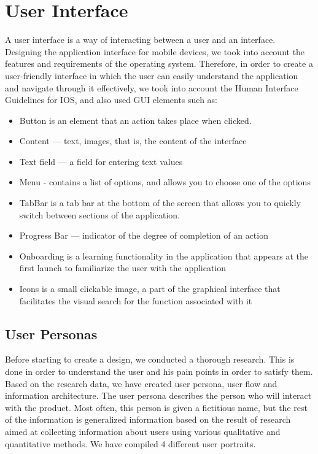 \section{User Interface}

A user interface is a way of interacting between a user and an interface. Designing the
application interface for mobile devices, we took into account the features and requirements of the operating system. Therefore, in order to create a user-friendly interface in which the user can easily understand the application and navigate through it effectively, we took into account the Human Interface Guidelines for IOS, and also used GUI elements such as: \cite{design}

\begin{itemize}
    \item Button is an element that an action takes place when clicked.
    \item Content — text, images, that is, the content of the interface
    \item Text field — a field for entering text values
    \item Menu - contains a list of options, and allows you to choose one of the options
    \item TabBar is a tab bar at the bottom of the screen that allows you to quickly switch between sections of the application.
    \item Progress Bar — indicator of the degree of completion of an action
    \item Onboarding is a learning functionality in the application that appears at the first launch to familiarize the user with the application
    \item Icons is a small clickable image, a part of the graphical interface that facilitates the visual search for the function associated with it
\end{itemize}

\subsection{User Personas}

    Before starting to create a design, we conducted a thorough research. This is done in order to understand the user and his pain points in order to satisfy them. Based on the research data, we have created user persona, user flow and information architecture. The user persona describes the person who will interact with the product. Most often, this
    person is given a fictitious name, but the rest of the information is generalized information based on the result of research aimed at collecting information about users using various qualitative and quantitative methods.  We have compiled 4 different user portraits.
    
